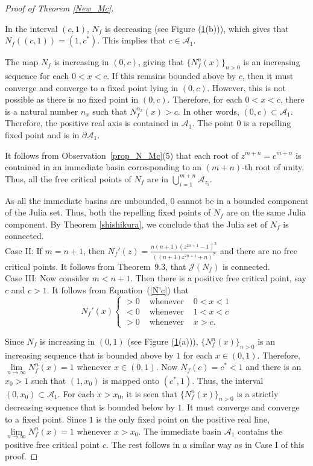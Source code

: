 \documentclass[12pt]{article}
\numberwithin{equation}{section}
\begin{document}
\begin{proof}[Proof of Theorem \ref{New_Mc}]
\begin{figure}[h!]
		\label{Plot_N_f}
	\end{figure}
	In the interval $(c, 1)$, $N_f$ is decreasing (see Figure (\ref{Plot_N_f}(b))), which gives that $N_f((c, 1))=(1, c^*)$. This implies that $c \in \mathcal{A}_1$.
	\par 
	The map $N_f$ is increasing in $(0,c)$, giving that $\{N_f ^{n}(x)\}_{n>0}$ is an increasing sequence for each $0< x< c$. If this remains bounded above by $c$, then it must converge and converge to a fixed point lying in $(0,c)$. However, this is not possible as there is no fixed point in $(0,c)$. Therefore, for each $0<x<c$, there is a natural number $n_x$ such that $N_f ^{n_x}(x)>c$. In other words,  $(0,c )\subset \mathcal{A}_1$. Therefore, the positive real axis is contained in $\mathcal{A}_1$. The point $0$ is a repelling fixed point and is in $ \partial \mathcal{A}_1$.
	\par  It follows from Observation~\ref{prop_N_Mc}(5) that each root of $z^{m+n} =c^{m+n}$ is contained in an immediate basin corresponding to an $(m+n)$-th root of unity. Thus, all the free critical points of $N_f$ are in $\bigcup_{i=1}^{m+n}\mathcal{A}_{z_i}$. 
	
	\par As all the immediate basins are unbounded, $0$ cannot be in a bounded component of the Julia set. Thus, both the repelling fixed points of $N_f$ are on the same Julia component. By Theorem \ref{shishikura}, we conclude that the Julia set of $N_f$ is connected.\\
 Case II: 
	If $m=n+1$, then $N_f'(z)=\frac{n(n+1)(z^{2 n+1}-1)^2}{((n+1) z^{2n+1}+n)^2}$ and there are no free critical points. It follows from Theorem~9.3, \cite{Milnor_book} that $\mathcal{J}(N_f)$ is connected.
	\\ {Case III:}
	Now consider $m < n+1$. Then there is a positive free critical point, say $c$ and $c>1$. It follows from Equation~(\ref{N'c}) that
	$$
	N_f'(x)\left\{\begin{array}{ccc}
	>0 & \text { whenever }& 0<x<1 \\
	<0 & \text { whenever } & 1<x<c \\
	>0 & \text { whenever } & x>c.
	\end{array}\right.
	$$
	
	Since  $N_f$ is increasing in $(0,1)$ (see Figure (\ref{Plot_N_f}(a))), $\{N_f ^{n}(x)\}_{n>0}$ is an increasing sequence that is bounded above by $1$ for each $x \in (0,1)$.  Therefore,
	$ \lim\limits_{n \rightarrow \infty} N_f^n(x)=1$ whenever $x \in(0,1)$.
	Now $N_f (c)=c^* <1$ and there is an $x_0 >1$ such that $(1, x_0)$ is mapped onto $(c^*, 1)$. Thus, the interval $(0, x_0) \subset \mathcal{A}_1$. For each $x >x_0$, it is seen that $\{N_f ^{n}(x)\}_{n>0}$ is a strictly decreasing sequence that is bounded below by $1$. It must converge and converge to a fixed point. Since $1$ is the only fixed point on the positive real line, $ \lim\limits_{n \rightarrow \infty} N_f^n(x)=1$ whenever $x > x_0$. The immediate basin $\mathcal{A}_1$ contains the positive free critical point $c$. The rest follows in a similar way as in Case I of this proof.
\end{proof}
\end{document}
